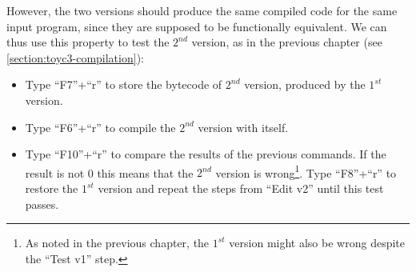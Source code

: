 However, the two versions should produce the same compiled code for the same
input program, since they are supposed to be functionally equivalent. We can
thus use this property to test the $2^{nd}$ version, as in the previous
chapter (see \cref{section:toyc3-compilation}):
\begin{itemize}
  \item Type ``F7''+``r'' to store the bytecode of $2^{nd}$ version, produced
  by the $1^{st}$ version.

  \item Type ``F6''+``r'' to compile the $2^{nd}$ version with itself.

  \item Type ``F10''+``r'' to compare the results of the previous commands. If
  the result is not 0 this means that the $2^{nd}$ version is wrong\footnote{As
  noted in the previous chapter, the $1^{st}$ version might also be wrong
  despite the ``Test v1'' step.}. Type ``F8''+``r'' to restore the $1^{st}$
  version and repeat the steps from ``Edit v2'' until this test passes.
\end{itemize}


